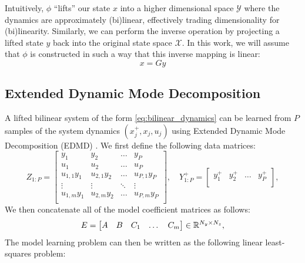 \documentclass{article}
\begin{document}
Intuitively, $\phi$ ``lifts'' our state $x$ into a higher dimensional space $\mathcal{Y}$
where the dynamics are approximately (bi)linear, effectively trading dimensionality for
(bi)linearity. Similarly, we can perform the inverse operation by projecting a lifted state
$y$ back into the original state space $\mathcal{X}$. In this work, we will assume that
$\phi$ is constructed in such a way that this inverse mapping is linear:
\begin{equation}
	x = G y
\end{equation}


\subsection{Extended Dynamic Mode Decomposition} \label{sec:edmd}

A lifted bilinear system of the form \eqref{eq:bilinear_dynamics} can be learned from $P$
samples of the system dynamics $(x_j^+,x_j,u_j)$ using Extended Dynamic Mode Decomposition
(EDMD) \cite{Williams2015,Folkestad2021}. We first define the following data matrices:
\begin{equation}
  Z_{1:P} = \begin{bmatrix}
    y_1         & y_2         & \dots  & y_P          \\
    u_1         & u_2         & \dots  & u_P          \\
    u_{1,1} y_1 & u_{2,1} y_2 & \dots  & u_{P,1} y_P  \\
    \vdots      & \vdots      & \ddots & \vdots       \\
    u_{1,m} y_1 & u_{2,m} y_2 & \dots  & u_{P,m} y_P  \\
  \end{bmatrix}, \quad 
  Y_{1:P}^+ = \begin{bmatrix}
    y_1^+         & y_2^+         & \dots  & y_P^+    \\
  \end{bmatrix},
\end{equation}
We then concatenate all of the model coefficient matrices as follows:
\begin{equation} \label{eq:E_matrixdef}
  E = \begin{bmatrix} A & B & C_1 & \dots & C_m \end{bmatrix} \in \mathbb{R}^{N_y \times N_z},
\end{equation}
The model learning problem can then be written as the following linear least-squares problem:
\end{document}
